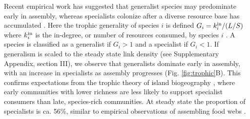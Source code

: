 \documentclass[twocolumn,preprintnumbers,amsmath,amssymb,superscriptaddress,linenumbers]{revtex4-1}
\newcommand{\rr}[1]{{\rm #1}}
\begin{document}
% 




Recent empirical work has suggested that generalist species may predominate early in assembly, whereas specialists colonize after a diverse resource base has accumulated \cite{Piechnik2008,Gravel2011}.
Here the trophic generality of species $i$ is defined $G_i = k^{\rm in}_i/(L/S)$ where $k^{\rm in}_i$ is the in-degree, or number of resources consumed, by species $i$ \cite{Williams2000}.
A species is classified as a generalist if $G_i > 1$ and a specialist if $G_i < 1$.
If generalism is scaled to the steady state link density (see Supplementary Appendix, section III), we observe that generalists dominate early in assembly, with an increase in specialists as assembly progresses (Fig. \ref{fig:trophic}B).
This confirms expectations from the trophic theory of island biogeography \cite{Gravel2011}, where early communities with lower richness are less likely to support specialist consumers than late, species-rich communities.
At steady state the proportion of specialists is ca. 56\%, similar to empirical observations of assembling food webs \cite{Piechnik2008}.
\end{document}
